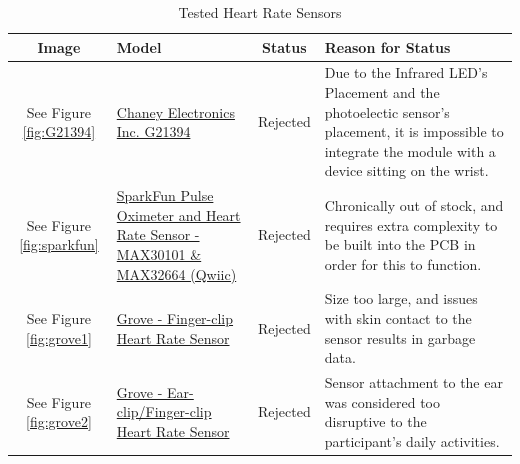 \documentclass[12pt, titlepage]{article}
\begin{document}
\begin{table}[H]
  \label{HRSensors}\caption{Tested Heart Rate Sensors}
  \begin{tabular}{ | c | m{3cm} | c | m{7cm} |}
    \hline
    \textbf{Image}                              & \textbf{Model}                                                                                                                                                    & \textbf{Status} & \textbf{Reason for Status}                                                                                                                                                                                                                                               \\
    \hline
    See Figure \ref{fig:G21394}    & \href{https://secure.sayal.com/STORE2/View_SHOP.php?SKU=247799}{Chaney Electronics Inc. G21394}                                                                   & Rejected        & Due to the Infrared LED's Placement and the photoelectic sensor's placement, it is impossible to integrate the module with a device sitting on the wrist.                                                                                                                \\
    \hline
    See Figure \ref{fig:sparkfun}     & \href{https://www.sparkfun.com/products/15219}{SparkFun Pulse Oximeter and Heart Rate Sensor - MAX30101 \& MAX32664 (Qwiic)}                                      & Rejected        & Chronically out of stock, and requires extra complexity to be built into the PCB in order for this to function.                                                                                                                                                          \\
    \hline
    See Figure \ref{fig:grove1}      & \href{https://www.seeedstudio.com/Grove-Finger-clip-Heart-Rate-Sensor.html?queryID=ad9334e40c7058a87ffd810044eecd1c                                               & objectID=711    & indexName=bazaar_retailer_products}{Grove - Finger-clip Heart Rate Sensor}                                                                                & Rejected & Size too large, and issues with skin contact to the sensor results in garbage data.               \\
    \hline
    See Figure \ref{fig:grove2}      & \href{https://www.seeedstudio.com/Grove-Ear-clip-Heart-Rate-Sensor.html?queryID=ad9334e40c7058a87ffd810044eecd1c                                                  & objectID=2143   & indexName=bazaar_retailer_products}{Grove - Ear-clip/Finger-clip Heart Rate Sensor}                                                                       & Rejected & Sensor attachment to the ear was considered too disruptive to the participant's daily activities. \\

\end{tabular}
\end{table}
\end{document}
